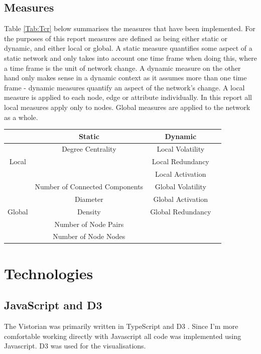\subsection{Measures}
Table \ref{Tab:Tcr} below summarises the measures that have been implemented. For the purposes of this report measures are defined as being either static or dynamic, and either local or global. A static measure quantifies some aspect of a static network and only takes into account one time frame when doing this, where a time frame is the unit of network change. A dynamic measure on the other hand only makes sense in a dynamic context as it assumes more than one time frame - dynamic measures quantify an aspect of the network's change. A local measure is applied to each node, edge or attribute individually. In this report all local measures apply only to nodes. Global measures are applied to the network as a whole.

\begin{center}
\begin{table}
\begin{tabular}{ |c|c|c|c| } 
\hline
 & Static & Dynamic \\
\hline
\multirow{3}{4em}{Local} & Degree Centrality & Local Volatility \\ 
& & Local Redundancy \\ 
& & Local Activation \\ 
\hline
\multirow{5}{4em}{Global} & Number of Connected Components & Global Volatility \\
 & Diameter & Global Activation \\
 & Density & Global Redundancy  \\
 & Number of Node Pairs &   \\
 & Number of Node Nodes &   \\
\hline
\end{tabular}
\end{table}
\end{center}


\section{Technologies}
\subsection{JavaScript and D3}
\label{sec:sec24}
The Vistorian was primarily written in TypeScript and D3 \cite{d3site}. Since I'm more comfortable working directly with Javascript all code was implemented using Javascript. D3 was used for the visualisations.

